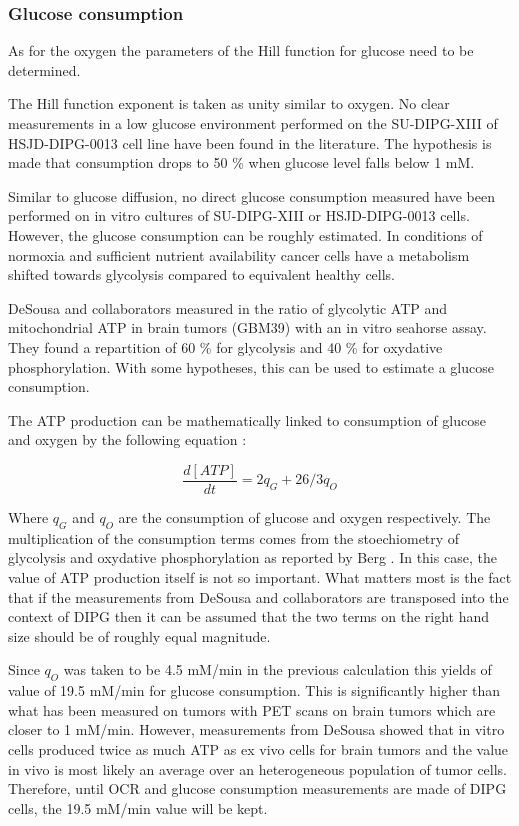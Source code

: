 \documentclass[11pt,a4paper]{article}
\begin{document}
\subsubsection{Glucose consumption}
As for the oxygen the parameters of the Hill function for glucose need to be determined. 

The Hill function exponent is taken as unity similar to oxygen. No clear measurements in a low glucose environment performed on the SU-DIPG-XIII of HSJD-DIPG-0013 cell line have been found in the literature. The hypothesis is made that consumption drops to 50 \% when glucose level falls below 1 mM.

Similar to glucose diffusion, no direct glucose consumption measured have been performed on in vitro cultures of SU-DIPG-XIII or HSJD-DIPG-0013 cells. 
However, the glucose consumption can be roughly estimated. In conditions  of normoxia and sufficient nutrient availability cancer cells have a metabolism shifted towards glycolysis compared to equivalent healthy cells.\cite{DeSousa2022}\cite{Mbah2022}\cite{Shen2019}

DeSousa and collaborators measured in the ratio of glycolytic ATP and mitochondrial ATP in brain tumors (GBM39) with an in vitro seahorse assay. They found a repartition of 60 \% for glycolysis and 40 \% for oxydative phosphorylation.\cite{DeSousa2022} With some hypotheses, this can be used to estimate a glucose consumption.

The ATP production can be mathematically linked to consumption of glucose and oxygen by the following equation :

\[ \frac{d[ATP]}{dt} = 2q_G + 26/3q_O \] 

Where $q_G$ and $q_O$ are the consumption of glucose  and oxygen respectively. The multiplication of the consumption terms comes from the stoechiometry of glycolysis and oxydative phosphorylation as reported by Berg \cite{Berg2006}. In this case, the value of ATP production itself is not so important. What matters most is the fact that if the measurements from DeSousa and collaborators are transposed into the context of DIPG then it can be assumed that the two terms on the right hand size should be of roughly equal magnitude.

Since $q_O$ was taken to be 4.5 mM/min in the previous calculation this yields of value of 19.5 mM/min for glucose consumption. This is significantly higher than what has been measured on tumors with PET scans on brain tumors which are closer to 1 mM/min.\cite{Hossmann1986}\cite{Herholz1992} However, measurements from DeSousa showed that in vitro cells produced twice as much ATP as ex vivo cells for brain tumors and  the value in vivo is most likely an average over an heterogeneous population of tumor cells.\cite{DeSousa2022} Therefore, until OCR and glucose consumption measurements are made of DIPG cells, the 19.5 mM/min value will be kept.
\end{document}
